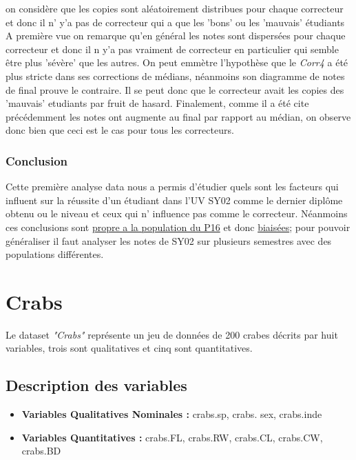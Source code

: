 \documentclass[10pt]{article}
\begin{document}
	on considère que les copies sont aléatoirement distribues pour chaque correcteur et donc il n' y'a pas de correcteur qui a que les 'bons' ou les 'mauvais' étudiants A première vue on remarque qu'en général les notes sont dispersées pour chaque correcteur et donc il n y'a pas vraiment de correcteur en particulier qui semble être plus 'sévère' que les autres. On peut emmètre l'hypothèse  que le \textit{Corr4} a été plus stricte dans ses corrections de médians, néanmoins son diagramme de notes de final prouve le contraire. Il se peut donc que le correcteur avait les copies des 'mauvais' etudiants par fruit de hasard. Finalement, comme il a été cite précédemment les notes ont augmente au final par rapport au médian, on observe donc bien que ceci est le cas pour tous les correcteurs.
	
	\subsubsection{Conclusion}
	Cette première analyse data nous a permis d'étudier  quels sont les facteurs qui influent sur la réussite d'un étudiant dans l'UV SY02 comme le dernier diplôme obtenu ou le niveau et ceux qui n' influence pas comme le correcteur. Néanmoins ces conclusions sont \underline{propre a la population du P16} et donc  \underline{biaisées}; pour pouvoir généraliser il faut analyser les notes de SY02 sur plusieurs semestres avec des populations différentes.
	
	\section{Crabs}
	Le dataset \textit{"Crabs"} représente un jeu de données de 200 crabes décrits par huit variables, trois sont qualitatives et cinq sont quantitatives.
	
	\subsection{Description des variables}
	
	
	\begin{itemize}
		\item \textbf{Variables Qualitatives Nominales :}  crabs.sp, crabs. sex, crabs.inde
		\item \textbf{Variables Quantitatives : } crabs.FL, crabs.RW, crabs.CL, crabs.CW, crabs.BD
	\end{itemize}
	
\end{document}
